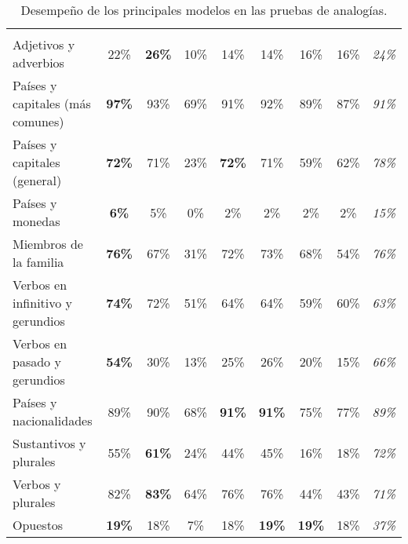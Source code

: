 \begin{table}[!h]
    \setlength\tabcolsep{4pt}
    \begin{tabularx}{\textwidth}{Y*{7}{c}|c}
        \toprule
        \midrule
         &  &  &  &
         &  &  &  & \\
        Adjetivos y adverbios &
        22\% & \textbf{26\%} & 10\% & 14\% & 14\% & 16\% & 16\% &
        \textit{24\%}\\
        Países y capitales (más comunes) &
        \textbf{97\%} & 93\% & 69\% & 91\% & 92\% & 89\% & 87\% &
        \textit{91\%}\\
        Países y capitales (general) &
        \textbf{72\%} & 71\% & 23\% & \textbf{72\%} & 71\% & 59\% & 62\% &
        \textit{78\%}\\
        Países y monedas &
        \textbf{6\%} & 5\% & 0\% & 2\% & 2\% & 2\% & 2\% &
        \textit{15\%}\\
        Miembros de la familia &
        \textbf{76\%} & 67\% & 31\% & 72\% & 73\% & 68\% & 54\% &
        \textit{76\%}\\
        Verbos en infinitivo y gerundios &
        \textbf{74\%} & 72\% & 51\% & 64\% & 64\% & 59\% & 60\% &
        \textit{63\%}\\
        Verbos en pasado y gerundios &
        \textbf{54\%} & 30\% & 13\% & 25\% & 26\% & 20\% & 15\% &
        \textit{66\%}\\
        Países y nacionalidades &
        89\% & 90\% & 68\% & \textbf{91\%} & \textbf{91\%} & 75\% & 77\% &
        \textit{89\%}\\
        Sustantivos y plurales &
        55\% & \textbf{61\%} & 24\% & 44\% & 45\% & 16\% & 18\% &
        \textit{72\%}\\
        Verbos y plurales &
        82\% & \textbf{83\%} & 64\% & 76\% & 76\% & 44\% & 43\% &
        \textit{71\%}\\
        Opuestos &
        \textbf{19\%} & 18\% & 7\% & 18\% & \textbf{19\%} & \textbf{19\%} & 18\% &
        \textit{37\%}\\
        \midrule
        \bottomrule
    \end{tabularx}
    \caption{Desempeño de los principales modelos en las pruebas de analogías.}
    \label{table:analogies_model_performance}
\end{table}

